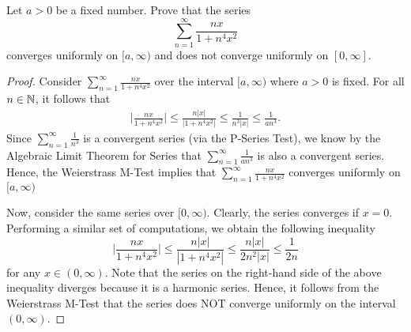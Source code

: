 \documentclass[a4paper]{article}
\begin{document}
\begin{problem}
    Let \( a > 0  \) be a fixed number. Prove that the series 
    \[  \sum_{ n=1  }^{ \infty  } \frac{ nx  }{ 1 + n^{4} x^{2} }  \]
    converges uniformly on \( [a,\infty) \) and does not converge uniformly on \( [0,\infty ] \).
\end{problem}
\begin{proof}
    Consider \( \sum_{ n=1  }^{ \infty  } \frac{ nx  }{ 1 + n^{4} x^{2} }  \) over the interval \( [a,\infty)  \) where \( a > 0  \) is fixed. For all \( n \in \mathbb{N} \), it follows that 
    \begin{align*}
        \Big| \frac{ nx }{ 1 + n^{4} x^{2} }  \Big| \leq \frac{ n | x  |  }{ | 1 + n^{4} x^{2} |  } \leq \frac{ 1  }{ n^{3} |  x  |  } \leq \frac{ 1 }{ a n^{3} }.
    \end{align*}
    Since \( \sum_{ n=1  }^{ \infty  } \frac{ 1 }{ n^{3} }  \) is a convergent series (via the P-Series Test), we know by the Algebraic Limit Theorem for Series that \( \sum_{ n=1  }^{ \infty  } \frac{ 1 }{ a n^{3} }  \) is also a convergent series. Hence, the Weierstrass M-Test implies that \( \sum_{ n=1  }^{ \infty  } \frac{ nx }{ 1 + n^{4} x^{2} }  \) converges uniformly on \( [a,\infty) \)

    Now, consider the same series over \( [0,\infty) \). Clearly, the series converges if \( x = 0  \). Performing a similar set of computations, we obtain the following inequality
    \[  \Big| \frac{ nx }{ 1 + n^{4} x^{2} }  \Big| \leq \frac{ n | x  |  }{  |  1 + n^{4} x^{2} |  } \leq \frac{ n | x  |  }{ 2 n^{2} |  x  |  } \leq   \frac{ 1 }{ 2n } \]
    for any \( x \in (0,\infty ) \). Note that the series on the right-hand side of the above inequality diverges because it is a harmonic series. Hence, it follows from the Weierstrass M-Test that the series does NOT converge uniformly on the interval \( (0,\infty ) \). 
\end{proof}
\end{document}
